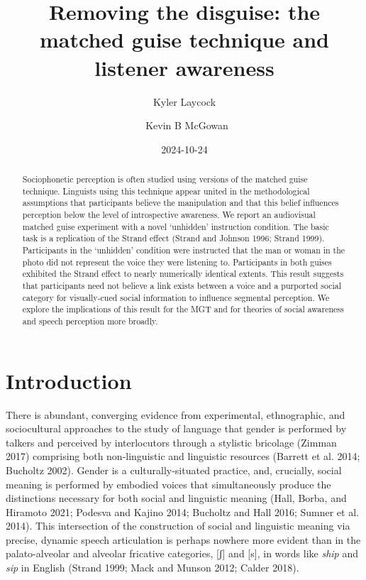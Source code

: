 \documentclass[
  letterpaper,
  DIV=11,
  numbers=noendperiod]{scrartcl}
\title{Removing the disguise: the matched guise technique and listener
awareness}
\author{Kyler Laycock \and ~Kevin B McGowan}
\date{2024-10-24}
\begin{document}
\maketitle
\begin{abstract}
Sociophonetic perception is often studied using versions of the matched
guise technique. Linguists using this technique appear united in the
methodological assumptions that participants believe the manipulation
and that this belief influences perception below the level of
introspective awareness. We report an audiovisual matched guise
experiment with a novel `unhidden' instruction condition. The basic task
is a replication of the Strand effect (Strand and Johnson 1996; Strand
1999). Participants in the `unhidden' condition were instructed that the
man or woman in the photo did not represent the voice they were
listening to. Participants in both guises exhibited the Strand effect to
nearly numerically identical extents. This result suggests that
participants need not believe a link exists between a voice and a
purported social category for visually-cued social information to
influence segmental perception. We explore the implications of this
result for the MGT and for theories of social awareness and speech
perception more broadly.
\end{abstract}


\section{Introduction}\label{sec-intro}

There is abundant, converging evidence from experimental, ethnographic,
and sociocultural approaches to the study of language that gender is
performed by talkers and perceived by interlocutors through a stylistic
bricolage (Zimman 2017) comprising both non-linguistic and linguistic
resources (Barrett et al. 2014; Bucholtz 2002). Gender is a
culturally-situated practice, and, crucially, social meaning is
performed by embodied voices that simultaneously produce the
distinctions necessary for both social and linguistic meaning (Hall,
Borba, and Hiramoto 2021; Podesva and Kajino 2014; Bucholtz and Hall
2016; Sumner et al. 2014). This intersection of the construction of
social and linguistic meaning via precise, dynamic speech articulation
is perhaps nowhere more evident than in the palato-alveolar and alveolar
fricative categories, {[}ʃ{]} and {[}s{]}, in words like \emph{ship} and
\emph{sip} in English (Strand 1999; Mack and Munson 2012; Calder 2018).
\end{document}
